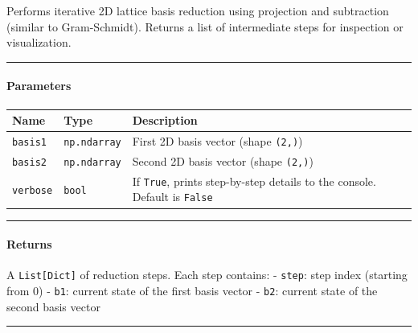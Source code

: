 \documentclass[a4paper,12pt]{article}
\begin{document}
\begin{tcolorbox}[breakable, size=fbox, boxrule=1pt, pad at break*=1mm,colback=cellbackground, colframe=cellborder]





Performs iterative 2D lattice basis reduction using projection and
subtraction (similar to Gram-Schmidt). Returns a list of intermediate
steps for inspection or visualization.

\begin{center}\rule{0.5\linewidth}{0.5pt}\end{center}

\paragraph{Parameters}\label{parameters}

\begin{longtable}[]{@{}
  >{\raggedright\arraybackslash}p{}
  >{\raggedright\arraybackslash}p{}
  >{\raggedright\arraybackslash}p{}@{}}
\toprule\noalign{}
\begin{minipage}[b]{\linewidth}\raggedright
Name
\end{minipage} & \begin{minipage}[b]{\linewidth}\raggedright
Type
\end{minipage} & \begin{minipage}[b]{\linewidth}\raggedright
Description
\end{minipage} \\
\midrule\noalign{}
\endhead
\bottomrule\noalign{}
\endlastfoot
\texttt{basis1} & \texttt{np.ndarray} & First 2D basis vector (shape
\texttt{(2,)}) \\
\texttt{basis2} & \texttt{np.ndarray} & Second 2D basis vector (shape
\texttt{(2,)}) \\
\texttt{verbose} & \texttt{bool} & If \texttt{True}, prints step-by-step
details to the console. Default is \texttt{False} \\
\end{longtable}

\begin{center}\rule{0.5\linewidth}{0.5pt}\end{center}


\paragraph*{ Returns}\label{returns}

A \texttt{List{[}Dict{]}} of reduction steps. Each step contains: -
\texttt{\textquotesingle{}step\textquotesingle{}}: step index (starting
from 0) - \texttt{\textquotesingle{}b1\textquotesingle{}}: current state
of the first basis vector -
\texttt{\textquotesingle{}b2\textquotesingle{}}: current state of the
second basis vector


\end{tcolorbox}
\begin{center}\rule{0.5\linewidth}{0.5pt}\end{center}
	
\end{document}

